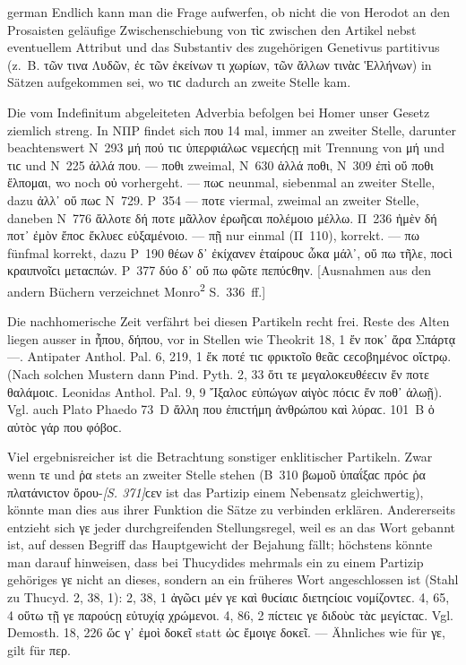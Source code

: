 \begin{otherlanguage*}{german}
Endlich kann man die Frage aufwerfen, ob nicht die von Herodot an den Prosaisten geläufige Zwischenschiebung von τὶϲ zwischen den Artikel nebst eventuellem Attribut und
das Substantiv des zugehörigen Genetivus partitivus (z.~B. τῶν τινα Λυδῶν, ἐϲ τῶν ἐκείνων τι χωρίων, τῶν ἄλλων τινὰϲ Ἑλλήνων) in Sätzen aufgekommen sei, wo τιϲ dadurch an zweite Stelle kam.

Die vom Indefinitum abgeleiteten Adverbia befolgen bei Homer unser Gesetz ziemlich streng. In ΝΠΡ findet sich που 14 mal, immer an zweiter Stelle, darunter beachtenswert Ν~293 μή πού τιϲ ὑπερφιάλωϲ νεμεϲήϲῃ mit Trennung von μή und τιϲ und Ν~225 ἀλλά που. — ποθι zweimal, Ν~630 ἀλλά ποθι, Ν~309 ἐπὶ οὔ ποθι ἔλπομαι, wo noch οὐ vorhergeht. — πωϲ neunmal, siebenmal an zweiter Stelle, dazu ἀλλ᾽ οὔ πωϲ Ν~729. Ρ~354 — ποτε viermal, zweimal an zweiter Stelle, daneben Ν~776 ἄλλοτε δή ποτε μᾶλλον ἐρωῆϲαι πολέμοιο μέλλω. Π~236 ἠμὲν δή ποτ᾽ ἐμὸν ἔποϲ ἔκλυεϲ εὐξαμένοιο. — πῇ nur einmal (Π~110), korrekt. — πω fünfmal korrekt, dazu Ρ~190 θέων δ᾽ ἐκίχανεν ἑταίρουϲ ὦκα μάλ᾽, οὔ πω τῆλε, ποϲὶ κραιπνοῖϲι μεταϲπών. Ρ~377 δύο δ᾽ οὔ πω φῶτε πεπύϲθην. [Ausnahmen aus den andern Büchern verzeichnet Monro\textsuperscript{2} S.~336~ff.]

Die nachhomerische Zeit verfährt bei diesen Partikeln recht frei. Reste des Alten liegen ausser in ἦπου, δήπου, vor in Stellen wie Theokrit 18, 1 ἔν ποκ᾽ ἄρα Σπάρτᾳ —. Antipater Anthol. Pal. 6, 219, 1 ἔκ ποτέ τιϲ φρικτοῖο θεᾶϲ ϲεϲοβημένοϲ οἴϲτρῳ. (Nach solchen Mustern dann Pind. Pyth. 2, 33 ὅτι τε μεγαλοκευθέεϲιν ἔν ποτε θαλάμοιϲ. Leonidas Anthol. Pal. 9, 9 Ἴξαλοϲ εὐπώγων αἰγὸϲ πόϲιϲ ἔν ποθ᾽ ἁλωῇ). Vgl. auch Plato Phaedo 73~D ἄλλη που ἐπιϲτήμη ἀνθρώπου καὶ λύραϲ. 101~Β ὁ αὐτὸϲ γάρ που φόβοϲ.

Viel ergebnisreicher ist die Betrachtung sonstiger enklitischer Partikeln. Zwar wenn τε und ῥα stets an zweiter Stelle stehen (Β~310 βωμοῦ ὑπαΐξαϲ πρόϲ ῥα πλατάνιϲτον ὄρου-\hypertarget{p371}{\emph{[S. 371]}}\label{p371}ϲεν ist das Partizip einem Nebensatz gleichwertig), könnte man dies aus ihrer Funktion die Sätze zu verbinden erklären. Andererseits entzieht sich γε jeder durchgreifenden Stellungsregel, weil es an das Wort gebannt ist, auf dessen Begriff das Hauptgewicht der Bejahung fällt; höchstens könnte man darauf hinweisen, dass bei Thucydides mehrmals ein zu einem Partizip gehöriges γε nicht an dieses, sondern an ein früheres Wort angeschlossen ist (Stahl zu Thucyd. 2, 38, 1): 2, 38, 1 ἀγῶϲι μέν γε καὶ θυϲίαιϲ διετηϲίοιϲ νομίζοντεϲ. 4, 65, 4 οὕτω τῇ γε παρούϲῃ εὐτυχίᾳ χρώμενοι. 4, 86, 2 πίϲτειϲ γε διδοὺϲ τὰϲ μεγίϲταϲ. Vgl. Demosth. 18, 226 ὥϲ γ᾽ ἐμοὶ δοκεῖ statt ὡϲ ἔμοιγε δοκεῖ. — Ähnliches wie für γε, gilt für περ.


\end{otherlanguage*}
